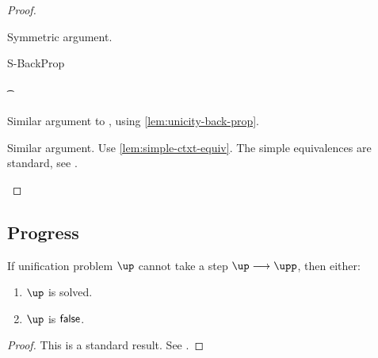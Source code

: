 \documentclass[acmsmall,screen,nonacm,review]{acmart}
\begin{document}
\begin{proof}
\begin{proofcases}
\begin{proofcases}
      \begin{llproof}
	Symmetric argument.
      \end{llproof}

    \end{proofcases}


  \proofcaserewrite
    {S-BackProp}
    {\C\where
       {\cletr \x \tv {\tvs} {\Ca\where{\cmatch \tvp \cbrs}}
                           {\Cb\where{\cpapp \x \tvp \tvc \inst}}} \\
    \tvp \in \reg \tv \tvs \\
     \cunif {\tvc} {\cunif \t \ueq} \in \C\where\Cb \\
     \x \disjoint \bvs \Cb}
    {\C\where{\cletr \x \tv {\tvs} {\Ca\where{\cmatched \tvp {\shape \t} \cbrs}}
		      {\Cb\where{\cpapp \x \tvp \tvc \inst}}}}


    \begin{llproof}
      Similar argument to , using \cref{lem:unicity-back-prop}.
    \end{llproof}


  \begin{llproof}
    Similar argument. Use \cref{lem:simple-ctxt-equiv}.
    The simple equivalences are standard, see \citet*{Pottier-Remy/emlti}.
  \end{llproof}
  \end{proofcases}
\end{proof}

\subsection{Progress}

\begin{lemma}
  If unification problem $\up$ cannot take a step $\up \unif \upp$, then either:
  \begin{enumerate}[(\roman*)]
    \item $\up$ is solved.
    \item $\up$ is $\mathsf{false}$.
    \end{enumerate}
  \begin{proof}
    This is a standard result. See \citet*{Pottier-Remy/emlti}.
  \end{proof}
\end{lemma}
\end{document}
